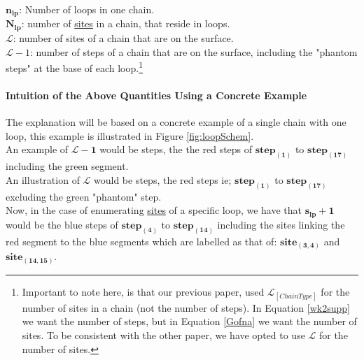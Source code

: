\documentclass[12pt,letterpaper]{article}
\newcommand{\leng}{\mathcal{L}}
\begin{document}
$
\boldsymbol{
n_{lp}
}
$: 
Number of loops in one chain.\\

$
\boldsymbol{
    N_{lp}
}
$: 
number of \underline{sites} in a chain, that reside in loops.\\

$\leng$: number of sites of a chain that are on the surface.\\

$\leng-1$: number of steps of a chain that are on the surface, including the "phantom steps" at the base of each loop.\footnote{Important to note here, is that our previous paper, used $\leng_{[ChainType]}$ for the number of sites in a chain (not the number of steps).  In Equation \ref{wk2supp} we want the number of steps, but in Equation \ref{Gofna} we want the number of sites. To be consistent with the other paper, we have opted to use $\leng$ for the number of sites.}\\


\paragraph{Intuition of the Above Quantities Using a Concrete Example} The explanation will be based on a concrete example of a single chain with one loop, this example is illustrated in Figure \ref{fig:loopSchem}.\\

An example of 
$
\boldsymbol{
\leng-1
}
$ 
would be steps, the the red steps of 
$
\boldsymbol{
step_{(1)}
}
$ 
to 
$
\boldsymbol{
step_{(17)}
}
$ 
including the green segment.\\

An illustration of $\boldsymbol{\leng}$ would be steps, the red steps ie; 
$
\boldsymbol{
step_{(1)}
}
$ 
to 
$
\boldsymbol{
step_{(17)}
}
$ 
excluding the green "phantom" step.\\

Now, in the case of enumerating \underline{sites} of a specific loop, we have that
$
\boldsymbol{
    s_{lp}
    +
    1
}
$
would be the blue steps of 
$
\boldsymbol{
step_{(4)}
}
$ 
to 
$
\boldsymbol{
step_{(14)}
}
$ 
including the sites linking the red segment to the blue segments which are labelled as that of: 
$
\boldsymbol{
site_{(3,4)}
}
$ 
and 
$
\boldsymbol{
site_{(14,15)}
}
$.\\
\end{document}
